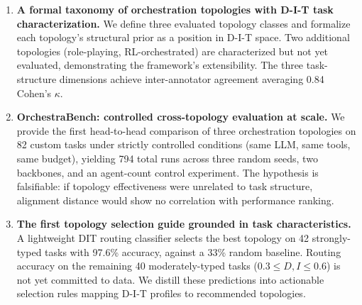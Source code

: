 \begin{enumerate}
\item
  \textbf{A formal taxonomy of orchestration topologies with D-I-T task characterization.} We define three evaluated topology classes and formalize each topology's structural prior as a position in D-I-T space. Two additional topologies (role-playing, RL-orchestrated) are characterized but not yet evaluated, demonstrating the framework's extensibility. The three task-structure dimensions achieve inter-annotator agreement averaging 0.84 Cohen's $\kappa$.
\item
  \textbf{OrchestraBench: controlled cross-topology evaluation at scale.} We provide the first head-to-head comparison of three orchestration topologies on 82 custom tasks under strictly controlled conditions (same LLM, same tools, same budget), yielding 794 total runs across three random seeds, two backbones, and an agent-count control experiment. The hypothesis is falsifiable: if topology effectiveness were unrelated to task structure, alignment distance would show no correlation with performance ranking.
\item
  \textbf{The first topology selection guide grounded in task characteristics.} A lightweight DIT routing classifier selects the best topology on 42 strongly-typed tasks with 97.6\% accuracy, against a 33\% random baseline. Routing accuracy on the remaining 40 moderately-typed tasks ($0.3 \leq D, I \leq 0.6$) is not yet committed to data. We distill these predictions into actionable selection rules mapping D-I-T profiles to recommended topologies.
\end{enumerate}
